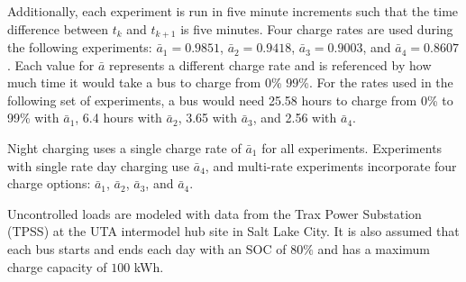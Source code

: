 	\par Additionally, each experiment is run in five minute increments such that the time difference between $t_k$ and $t_{k+1}$ is five minutes.  Four charge rates are used during the following experiments: $\bar{a}_1 = 0.9851$, $\bar{a}_2 = 0.9418$, $\bar{a}_3 = 0.9003$, and $\bar{a}_4 = 0.8607$.  Each value for $\bar{a}$ represents a different charge rate and is referenced by how much time it would take a bus to charge from $0$\% $99$\%. For the rates used in the following set of experiments, a bus would need 25.58 hours to charge from 0\% to 99\% with $\bar{a}_1$, 6.4 hours with $\bar{a}_2$, 3.65 with $\bar{a}_3$, and 2.56 with $\bar{a}_4$. 
	\par Night charging uses a single charge rate of $\bar{a}_1$ for all experiments. Experiments with single rate day charging use $\bar{a}_4$, and multi-rate experiments incorporate four charge options: $\bar{a}_1$, $\bar{a}_2$, $\bar{a}_3$, and $\bar{a}_4$.
	\par Uncontrolled loads are modeled with data from the Trax Power Substation (TPSS) at the UTA intermodel hub site in Salt Lake City. It is also assumed that each bus starts and ends each day with an SOC of $80\%$ and has a maximum charge capacity of $100$ kWh.
